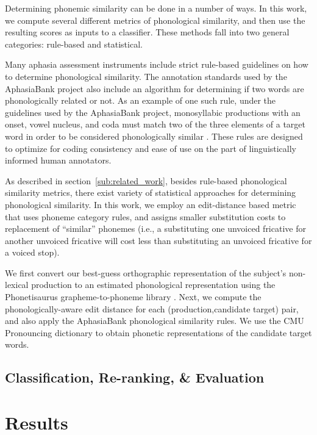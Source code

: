 \documentclass[11pt,letterpaper]{article}
\begin{document}
Determining phonemic similarity can be done in a number of ways. 
In this work, we compute several different metrics of phonological similarity, and then use the resulting scores as inputs to a classifier. 
These methods fall into two general categories: rule-based and statistical.

Many aphasia assessment instruments include strict rule-based guidelines on how to determine phonological similarity.
The annotation standards used by the AphasiaBank project also include an algorithm for determining if two words are phonologically related or not.
As an example of one such rule, under the guidelines used by the AphasiaBank project, monosyllabic productions with an onset, vowel nucleus, and coda must match two of the three elements of a target word in order to be considered phonologically similar \cite{MacWhinney:2000aa}.
These rules are designed to optimize for coding consistency and ease of use on the part of linguistically informed human annotators.

As described in section~\ref{sub:related_work}, besides rule-based phonological similarity metrics, there exist variety of statistical approaches for determining phonological similarity. 
In this work, we employ an edit-distance based metric that uses phoneme category rules, and assigns smaller substitution costs to replacement of ``similar'' phonemes (i.e., a substituting one unvoiced fricative for another unvoiced fricative will cost less than substituting an unvoiced fricative for a voiced stop).

We first convert our best-guess orthographic representation of the subject's non-lexical production to an estimated phonological representation using the Phonetisaurus grapheme-to-phoneme library \cite{Novak:2011aa}. 
Next, we compute the phonologically-aware edit distance for each (production,candidate target) pair, and also apply the AphasiaBank phonological similarity rules. We use the CMU Pronouncing dictionary to obtain phonetic representations of the candidate target words.


\subsection{Classification, Re-ranking, \& Evaluation} %
\label{sub:ranking_scoring}


\section{Results} %
\label{sec:results}
\end{document}
